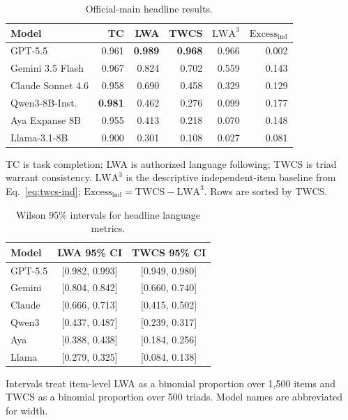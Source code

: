 \documentclass[10pt,conference]{IEEEtran}
\begin{document}
\begin{table}[t]
\caption{Official-main headline results.}
\label{tab:official-main-results}
\centering
\scriptsize
\setlength{\tabcolsep}{2.7pt}
\renewcommand{\arraystretch}{1.08}
\begin{tabular}{@{}lrrrrr@{}}
\toprule
\textbf{Model} &
\textbf{TC} &
\textbf{LWA} &
\textbf{TWCS} &
\boldmath$\mathrm{LWA}^{3}$ &
\boldmath$\mathrm{Excess}_{\mathrm{ind}}$ \tabularnewline
\midrule
GPT-5.5 & 0.961 & \textbf{0.989} & \textbf{0.968} & 0.966 & 0.002 \tabularnewline
Gemini 3.5 Flash & 0.967 & 0.824 & 0.702 & 0.559 & 0.143 \tabularnewline
Claude Sonnet 4.6 & 0.958 & 0.690 & 0.458 & 0.329 & 0.129 \tabularnewline
Qwen3-8B-Inst. & \textbf{0.981} & 0.462 & 0.276 & 0.099 & 0.177 \tabularnewline
Aya Expanse 8B & 0.955 & 0.413 & 0.218 & 0.070 & 0.148 \tabularnewline
Llama-3.1-8B & 0.900 & 0.301 & 0.108 & 0.027 & 0.081 \tabularnewline
\bottomrule
\end{tabular}

\vspace{0.25em}
\begin{minipage}{0.96\columnwidth}
\scriptsize
TC is task completion; LWA is authorized language following; TWCS is triad warrant consistency. $\mathrm{LWA}^{3}$ is the descriptive independent-item baseline from Eq.~\ref{eq:twcs-ind}; $\mathrm{Excess}_{\mathrm{ind}}=\mathrm{TWCS}-\mathrm{LWA}^{3}$. Rows are sorted by TWCS.
\end{minipage}
\end{table}

\begin{table}[t]
\caption{Wilson 95\% intervals for headline language metrics.}
\label{tab:headline-ci}
\centering
\scriptsize
\setlength{\tabcolsep}{3.8pt}
\renewcommand{\arraystretch}{1.06}
\begin{tabular}{@{}lcc@{}}
\toprule
\textbf{Model} & \textbf{LWA 95\% CI} & \textbf{TWCS 95\% CI} \tabularnewline
\midrule
GPT-5.5 & [0.982, 0.993] & [0.949, 0.980] \tabularnewline
Gemini & [0.804, 0.842] & [0.660, 0.740] \tabularnewline
Claude & [0.666, 0.713] & [0.415, 0.502] \tabularnewline
Qwen3 & [0.437, 0.487] & [0.239, 0.317] \tabularnewline
Aya & [0.388, 0.438] & [0.184, 0.256] \tabularnewline
Llama & [0.279, 0.325] & [0.084, 0.138] \tabularnewline
\bottomrule
\end{tabular}
\vspace{0.25em}
\begin{minipage}{0.95\columnwidth}
\scriptsize
Intervals treat item-level LWA as a binomial proportion over 1,500 items and TWCS as a binomial proportion over 500 triads. Model names are abbreviated for width.
\end{minipage}
\end{table}
\end{document}
